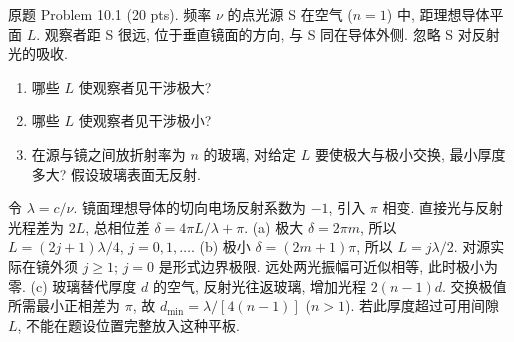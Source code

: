 \begin{exercise}\label{ps:10.1}
原题 Problem 10.1 (20 pts). 频率 $\nu$ 的点光源 S 在空气 ($n=1$) 中, 距理想导体平面 $L$. 观察者距 S 很远, 位于垂直镜面的方向, 与 S 同在导体外侧. 忽略 S 对反射光的吸收.
\begin{enumerate}[label=\alph*.]
\item 哪些 $L$ 使观察者见干涉极大?
\item 哪些 $L$ 使观察者见干涉极小?
\item 在源与镜之间放折射率为 $n$ 的玻璃, 对给定 $L$ 要使极大与极小交换, 最小厚度多大? 假设玻璃表面无反射.
\end{enumerate}
\end{exercise}
\begin{solution}
令 $\lambda=c/\nu$. 镜面理想导体的切向电场反射系数为 $-1$, 引入 $\pi$ 相变. 直接光与反射光程差为 $2L$, 总相位差 $\delta=4\pi L/\lambda+\pi$.
(a) 极大 $\delta=2\pi m$, 所以 $L=(2j+1)\lambda/4$, $j=0,1,\ldots$.
(b) 极小 $\delta=(2m+1)\pi$, 所以 $L=j\lambda/2$. 对源实际在镜外须 $j\ge1$; $j=0$ 是形式边界极限. 远处两光振幅可近似相等, 此时极小为零.
(c) 玻璃替代厚度 $d$ 的空气, 反射光往返玻璃, 增加光程 $2(n-1)d$. 交换极值所需最小正相差为 $\pi$, 故 $d_{\min}=\lambda/[4(n-1)]$ ($n>1$). 若此厚度超过可用间隙 $L$, 不能在题设位置完整放入这种平板.
\end{solution}

